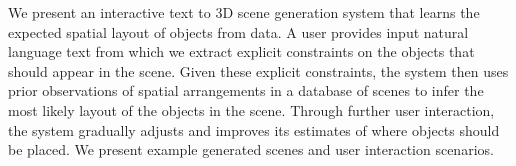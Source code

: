 We present an interactive text to 3D scene generation system that learns the expected spatial layout of objects from data.  A user provides input natural language text from which we extract explicit constraints on the objects that should appear in the scene.  Given these explicit constraints, the system then uses prior observations of spatial arrangements in a database of scenes to infer the most likely layout of the objects in the scene.  Through further user interaction, the system gradually adjusts and improves its estimates of where objects should be placed.  We present example generated scenes and user interaction scenarios.
